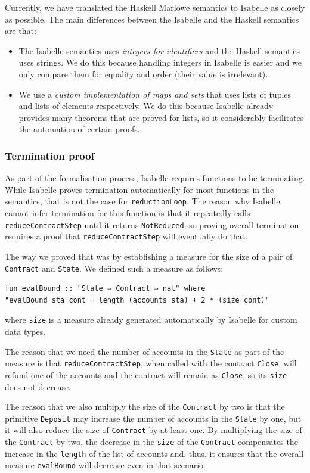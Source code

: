 \documentclass[runningheads]{llncs}
\begin{document}
Currently, we have translated the Haskell Marlowe semantics to Isabelle as closely as possible. The main differences between the Isabelle and the Haskell semantics are that:
\begin{itemize}
    \item The Isabelle semantics uses \emph{integers for identifiers} and the Haskell semantics uses strings. We do this because handling integers in Isabelle is easier and we only compare them for equality and order (their value is irrelevant).
    \item We use a \emph{custom implementation of maps and sets} that uses lists of tuples and lists of elements respectively. We do this because Isabelle already provides many theorems that are proved for lists, so it considerably facilitates the automation of certain proofs.
\end{itemize}

\subsubsection{Termination proof}

As part of the formalisation process, Isabelle requires functions to be terminating. While  Isabelle proves termination automatically for most functions in the semantics, that is not the case for \texttt{reductionLoop}. The reason why Isabelle cannot infer termination for this function is that it repeatedly calls \texttt{reduceContractStep} until it returns \texttt{NotReduced}, so proving overall termination  requires a proof that \texttt{reduceContractStep} will eventually do that.

The way we proved that was by establishing a measure for the size of a pair of \texttt{Contract} and \texttt{State}. We defined such a measure as follows:

\begin{verbatim}
fun evalBound :: "State ⇒ Contract ⇒ nat" where
"evalBound sta cont = length (accounts sta) + 2 * (size cont)"
\end{verbatim}
\noindent
where \texttt{size} is a measure already generated automatically by Isabelle for custom data types.

The reason that we need the number of accounts in the \texttt{State} as part of the measure is that \texttt{reduceContractStep}, when called with the contract \texttt{Close}, will refund one of the accounts and the contract will remain as \texttt{Close}, so its \texttt{size} does not decrease.

The reason that we also multiply the size of the \texttt{Contract} by two is that the primitive \texttt{Deposit} may increase the number of accounts in the \texttt{State} by one, but it will also reduce the size of \texttt{Contract} by at least one. By multiplying the size of the \texttt{Contract} by two, the decrease in the \texttt{size} of the \texttt{Contract} compensates the increase in the \texttt{length} of the list of accounts and, thus, it ensures that the overall measure \texttt{evalBound} will decrease even in that scenario.
\end{document}
